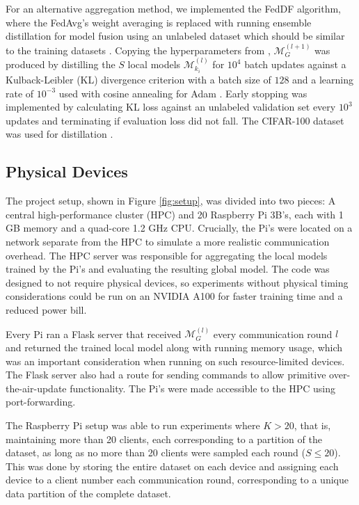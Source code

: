\documentclass{article}
\begin{document}
For an alternative aggregation method, we implemented the FedDF algorithm, where the FedAvg's weight averaging is replaced with running ensemble distillation for model fusion using an unlabeled dataset which should be similar to the training datasets \cite{lin2020ensemble}.
Copying the hyperparameters from \cite{lin2020ensemble}, $\mathcal M_G^{(l + 1)}$ was produced by distilling the $S$ local models $\mathcal M_{k_i}^{(l)}$ for $10^4$ batch updates against a Kulback-Leibler (KL) divergence criterion with a batch size of $128$ and a learning rate of $10^{-3}$ used with cosine annealing for Adam \cite{losh2016sgdr,kingma2015adam}.
Early stopping was implemented by calculating KL loss against an unlabeled validation set every $10^3$ updates and terminating if evaluation loss did not fall.
The CIFAR-100 dataset was used for distillation \cite{alex2009learning}.

\subsection{Physical Devices}
The project setup, shown in Figure \ref{fig:setup}, was divided into two pieces: A central high-performance cluster (HPC) and 20 Raspberry Pi 3B's, each with 1 GB memory and a quad-core 1.2 GHz CPU.
Crucially, the Pi's were located on a network separate from the HPC to simulate a more realistic communication overhead.
The HPC server was responsible for aggregating the local models trained by the Pi's and evaluating the resulting global model.
The code was designed to not require physical devices, so experiments without physical timing considerations could be run on an NVIDIA A100 for faster training time and a reduced power bill.

Every Pi ran a Flask server that received $\mathcal M_G^{(l)}$ every communication round $l$ and returned the trained local model along with running memory usage, which was an important consideration when running on such resource-limited devices.
The Flask server also had a route for sending commands to allow primitive over-the-air-update functionality.
The Pi's were made accessible to the HPC using port-forwarding.

The Raspberry Pi setup was able to run experiments where $K > 20$, that is, maintaining more than 20 clients, each corresponding to a partition of the dataset, as long as no more than 20 clients were sampled each round ($S \leq 20$).
This was done by storing the entire dataset on each device and assigning each device to a client number each communication round, corresponding to a unique data partition of the complete dataset.
\end{document}
